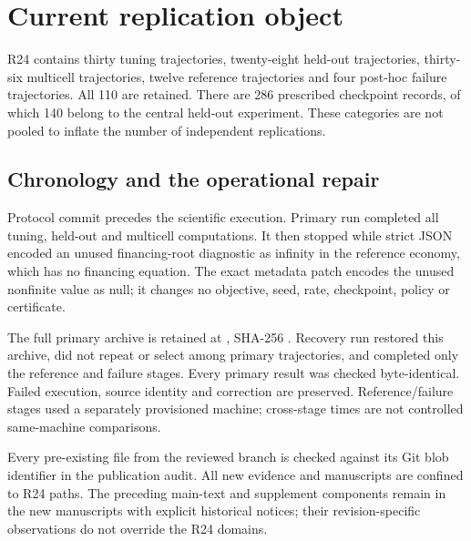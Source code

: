 \section{Current replication object}
R24 contains thirty tuning trajectories, twenty-eight held-out trajectories, thirty-six multicell trajectories, twelve reference trajectories and four post-hoc failure trajectories. All 110 are retained. There are 286 prescribed checkpoint records, of which 140 belong to the central held-out experiment. These categories are not pooled to inflate the number of independent replications.

\subsection{Chronology and the operational repair}
Protocol commit  precedes the scientific execution. Primary run  completed all tuning, held-out and multicell computations. It then stopped while strict JSON encoded an unused financing-root diagnostic as infinity in the reference economy, which has no financing equation. The exact metadata patch encodes the unused nonfinite value as null; it changes no objective, seed, rate, checkpoint, policy or certificate.

The full primary archive is retained at , SHA-256 . Recovery run  restored this archive, did not repeat or select among primary trajectories, and completed only the reference and failure stages. Every primary result was checked byte-identical. Failed execution, source identity and correction are preserved. Reference/failure stages used a separately provisioned machine; cross-stage times are not controlled same-machine comparisons.

Every pre-existing file from the reviewed branch is checked against its Git blob identifier in the publication audit. All new evidence and manuscripts are confined to R24 paths. The preceding main-text and supplement components remain in the new manuscripts with explicit historical notices; their revision-specific observations do not override the R24 domains.

